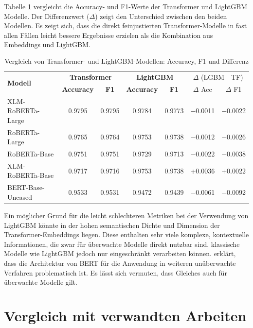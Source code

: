 Tabelle \ref{tab:transformer_vs_lightgbm} vergleicht die Accuracy- und F1-Werte der Transformer und LightGBM Modelle.
Der Differenzwert ($\Delta$) zeigt den Unterschied zwischen den beiden Modellen.
Es zeigt sich, dass die direkt feinjustierten Transformer-Modelle in fast allen Fällen leicht bessere Ergebnisse erzielen als die Kombination aus 
Embeddings und LightGBM.

\begin{table}[!ht]
\centering
\begin{tabular}{lcccccc}
    \toprule
    \multirow{2}{*}{\textbf{Modell}} &
    \multicolumn{2}{c}{\textbf{Transformer}} &
    \multicolumn{2}{c}{\textbf{LightGBM}} &
    \multicolumn{2}{c}{$\Delta$ (LGBM - TF)} \\
    \cmidrule(lr){2-3} \cmidrule(lr){4-5} \cmidrule(l){6-7}
    & \textbf{Accuracy} & \textbf{F1} & \textbf{Accuracy} & \textbf{F1} & $\Delta$ Acc & $\Delta$ F1 \\
    \midrule
    XLM-RoBERTa-Large & 0.9795 & 0.9795 & 0.9784 & 0.9773 & $-$0.0011 & $-$0.0022 \\
    RoBERTa-Large     & 0.9765 & 0.9764 & 0.9753 & 0.9738 & $-$0.0012 & $-$0.0026 \\
    RoBERTa-Base      & 0.9751 & 0.9751 & 0.9729 & 0.9713 & $-$0.0022 & $-$0.0038 \\
    XLM-RoBERTa-Base  & 0.9717 & 0.9716 & 0.9753 & 0.9738 & +0.0036 & +0.0022 \\
    BERT-Base-Uncased & 0.9533 & 0.9531 & 0.9472 & 0.9439 & $-$0.0061 & $-$0.0092 \\
    \bottomrule
\end{tabular}
\caption{Vergleich von Transformer- und LightGBM-Modellen: Accuracy, F1 und Differenz}
\label{tab:transformer_vs_lightgbm}
\end{table}

Ein möglicher Grund für die leicht schlechteren Metriken bei der Verwendung von LightGBM könnte in der hohen semantischen Dichte und Dimension der 
Transformer-Embeddings liegen. Diese enthalten sehr viele komplexe, kontextuelle Informationen, die zwar für überwachte Modelle direkt nutzbar sind, 
klassische Modelle wie LightGBM jedoch nur eingeschränkt verarbeiten können.
\cite{reimers-gurevych-2019-sentence} erklärt, dass die Architektur von BERT für die Anwendung in weiteren unüberwachte Verfahren problematisch ist.
Es lässt sich vermuten, dass Gleiches auch für überwachte Modelle gilt.

\section{Vergleich mit verwandten Arbeiten}

